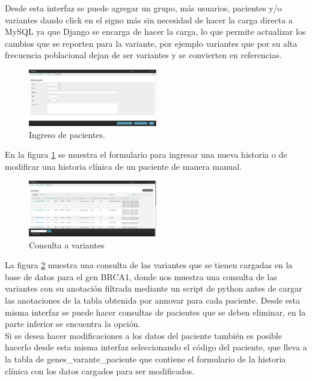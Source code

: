 Desde esta interfaz se puede agregar un grupo, más usuarios, pacientes y/o variantes dando click en el signo más sin necesidad de hacer la carga directa a MySQL ya que Django se encarga de hacer la carga, lo que permite actualizar los cambios que se reporten para la variante, por ejemplo variantes que por su alta frecuencia poblacional dejan de ser variantes y se convierten en referencias. \\

\begin{figure}[h] 
	\centering
	\includegraphics[width=0.5\textwidth]{Kap3/ingresar_paciente}
	\caption{Ingreso de pacientes.} \label{fig:pacientes}
\end{figure}

En la figura \ref{fig:pacientes} se muestra el formulario para ingresar una nueva historia o de modificar una historia clínica de un paciente de manera manual.

\begin{figure}[h] 
	\centering
	\includegraphics[width=0.5\textwidth]{Kap3/consulta}
	\caption{Consulta a variantes} \label{fig:consulta}
\end{figure}


La figura \ref{fig:consulta} muestra una consulta de las variantes que se tienen cargadas en la base de datos para el gen BRCA1, donde nos muestra una consulta de las variantes con su anotación  filtrada mediante un script de python antes de cargar las anotaciones de la tabla obtenida por annovar para cada paciente. Desde esta misma interfaz se puede hacer consultas de pacientes que se deben eliminar, en la parte inferior se encuentra la opción.\\

Si se desea hacer modificaciones a los datos del paciente también es posible hacerlo desde esta misma interfaz seleccionando el código del paciente, que lleva a la tabla de genes\_varante\_paciente que contiene el formulario de la historia clínica con los datos cargados para ser modificados. 

